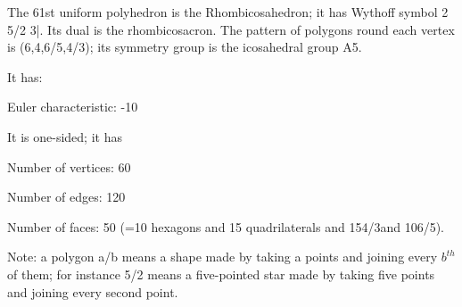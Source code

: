 The 61st uniform polyhedron is the Rhombicosahedron; it has Wythoff symbol 2 5/2 3|. Its dual is the rhombicosacron. The pattern of polygons round each vertex is (6,4,6/5,4/3); its symmetry group is the icosahedral group A5.\par
It has:\par
Euler characteristic: -10\par
It is one-sided; it has\par
Number of vertices: 60\par
Number of edges:  120\par
Number of faces: 50 (=10 hexagons and 15 quadrilaterals and 15{4/3}and 10{6/5}).\par
Note: a polygon a/b means a shape made by taking a points and joining every $b^{th}$  of them; for instance 5/2 means a five-pointed star made by taking five points and joining every second point.